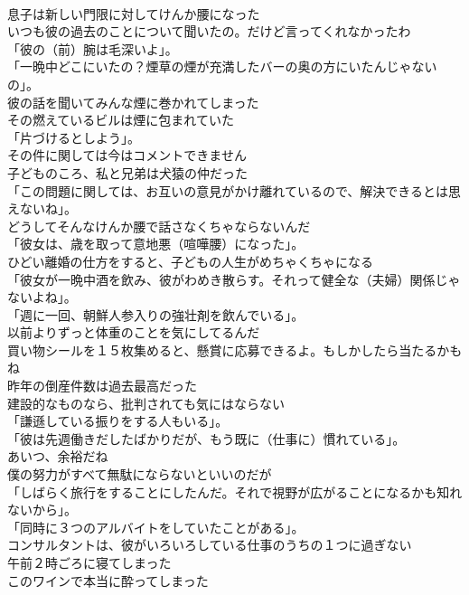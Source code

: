\documentclass[8pt]{extreport}
\begin{document}
\begin{CJK}{UTF8}{min}
\\	息子は新しい門限に対してけんか腰になった	
\\	いつも彼の過去のことについて聞いたの。だけど言ってくれなかったわ	
\\	「彼の（前）腕は毛深いよ」。	
\\	「一晩中どこにいたの？煙草の煙が充満したバーの奥の方にいたんじゃないの」。	
\\	彼の話を聞いてみんな煙に巻かれてしまった	
\\	その燃えているビルは煙に包まれていた	
\\	「片づけるとしよう」。	
\\	その件に関しては今はコメントできません	
\\	子どものころ、私と兄弟は犬猿の仲だった	
\\	「この問題に関しては、お互いの意見がかけ離れているので、解決できるとは思えないね」。	
\\	どうしてそんなけんか腰で話さなくちゃならないんだ	
\\	「彼女は、歳を取って意地悪（喧嘩腰）になった」。	
\\	ひどい離婚の仕方をすると、子どもの人生がめちゃくちゃになる	
\\	「彼女が一晩中酒を飲み、彼がわめき散らす。それって健全な（夫婦）関係じゃないよね」。	
\\	「週に一回、朝鮮人参入りの強壮剤を飲んでいる」。	
\\	以前よりずっと体重のことを気にしてるんだ	
\\	買い物シールを１５枚集めると、懸賞に応募できるよ。もしかしたら当たるかもね	
\\	昨年の倒産件数は過去最高だった	
\\	建設的なものなら、批判されても気にはならない	
\\	「謙遜している振りをする人もいる」。	
\\	「彼は先週働きだしたばかりだが、もう既に（仕事に）慣れている」。	
\\	あいつ、余裕だね	
\\	僕の努力がすべて無駄にならないといいのだが	
\\	「しばらく旅行をすることにしたんだ。それで視野が広がることになるかも知れないから」。	
\\	「同時に３つのアルバイトをしていたことがある」。	
\\	コンサルタントは、彼がいろいろしている仕事のうちの１つに過ぎない	
\\	午前２時ごろに寝てしまった	
\\	このワインで本当に酔ってしまった	

\end{CJK}
\end{document}
